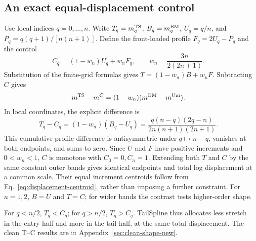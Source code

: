 \subsection{An exact equal-displacement control}
\label{sec:tailspline-dose-control}
Use local indices $q=0,\ldots,n$. Write $T_q=m_q^{\rm TS}$, $B_q=m_q^{\rm BM}$, $U_q=q/n$, and $P_q=q(q+1)/[n(n+1)]$. Define the front-loaded profile $F_q=2U_q-P_q$ and the control
\begin{equation}
C_q=(1-w_n)U_q+w_nF_q,\qquad w_n=\frac{3n}{2(2n+1)}.
\label{eq:tailspline-dose-control}
\end{equation}
Substitution of the finite-grid formulas gives $T=(1-w_n)B+w_nF$. Subtracting $C$ gives
\begin{equation}
m^{\rm TS}-m^C=(1-w_n)(m^{\rm BM}-m^{\rm Uni}).
\label{eq:tailspline-shape-contrast}
\end{equation}
In local coordinates, the explicit difference is
\begin{equation}
T_q-C_q=(1-w_n)(B_q-U_q)=\frac{q(n-q)(2q-n)}{2n(n+1)(2n+1)}.
\label{eq:tailspline-antisymmetric-contrast}
\end{equation}
This cumulative-profile difference is antisymmetric under $q\mapsto n-q$, vanishes at both endpoints, and sums to zero. Since $U$ and $F$ have positive increments and $0<w_n<1$, $C$ is monotone with $C_0=0,C_n=1$. Extending both $T$ and $C$ by the same constant outer bands gives identical endpoints and total log displacement at a common scale. Their equal increment centroids follow from Eq.~\eqref{eq:displacement-centroid}, rather than imposing a further constraint. For $n=1,2$, $B=U$ and $T=C$; for wider bands the contrast tests higher-order shape.

For $q<n/2$, $T_q<C_q$; for $q>n/2$, $T_q>C_q$. TailSpline thus
allocates less stretch in the entry half and more in the tail half, at the same
total displacement. The clean T--C results are in Appendix~\ref{sec:clean-shape-new}.

